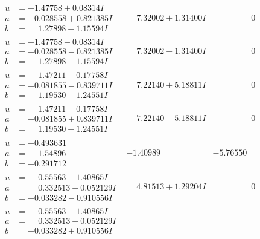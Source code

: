 \documentclass[1p]{elsarticle_modified}
\theoremstyle{definition}
\begin{document}
$$\begin{array}{c|c|c}
\begin{aligned}
u &= -1.47758 + 0.08314 I \\
a &= -0.028558 + 0.821385 I \\
b &= \phantom{-}1.27898 - 1.15594 I\end{aligned}
 & \phantom{-}7.32002 + 1.31400 I & \phantom{-0.000000 } 0 \\ \hline\begin{aligned}
u &= -1.47758 - 0.08314 I \\
a &= -0.028558 - 0.821385 I \\
b &= \phantom{-}1.27898 + 1.15594 I\end{aligned}
 & \phantom{-}7.32002 - 1.31400 I & \phantom{-0.000000 } 0 \\ \hline\begin{aligned}
u &= \phantom{-}1.47211 + 0.17758 I \\
a &= -0.081855 - 0.839711 I \\
b &= \phantom{-}1.19530 + 1.24551 I\end{aligned}
 & \phantom{-}7.22140 + 5.18811 I & \phantom{-0.000000 } 0 \\ \hline\begin{aligned}
u &= \phantom{-}1.47211 - 0.17758 I \\
a &= -0.081855 + 0.839711 I \\
b &= \phantom{-}1.19530 - 1.24551 I\end{aligned}
 & \phantom{-}7.22140 - 5.18811 I & \phantom{-0.000000 } 0 \\ \hline\begin{aligned}
u &= -0.493631\phantom{ +0.000000I} \\
a &= \phantom{-}1.54896\phantom{ +0.000000I} \\
b &= -0.291712\phantom{ +0.000000I}\end{aligned}
 & -1.40989\phantom{ +0.000000I} & -5.76550\phantom{ +0.000000I} \\ \hline\begin{aligned}
u &= \phantom{-}0.55563 + 1.40865 I \\
a &= \phantom{-}0.332513 + 0.052129 I \\
b &= -0.033282 - 0.910556 I\end{aligned}
 & \phantom{-}4.81513 + 1.29204 I & \phantom{-0.000000 } 0 \\ \hline\begin{aligned}
u &= \phantom{-}0.55563 - 1.40865 I \\
a &= \phantom{-}0.332513 - 0.052129 I \\
b &= -0.033282 + 0.910556 I\end{aligned}

\end{array}$$
\end{document}
